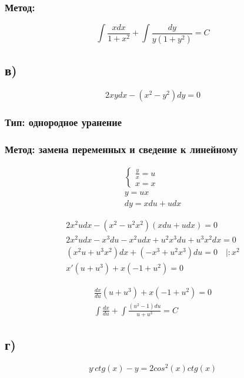 \documentclass[a4paper]{article}
\begin{document}
\subsubsection*{Метод:}
\begin{equation*}
\int \frac{xdx}{1+x^2}+\int \frac{dy}{y(1+y^2)} = C
\end{equation*}

\subsection*{в)}
\begin{equation*}
2xy dx - (x^2 - y^2)dy = 0
\end{equation*}
\subsubsection*{Тип: однородное уранение}

\subsubsection*{Метод: замена переменных и сведение к линейному}

\begin{gather*}
\begin{cases}
\frac{y}{x}=u \\
x=x
\end{cases}\\
y=ux \\
dy=xdu+udx
\end{gather*}

\begin{gather*}
2x^2udx-(x^2-u^2x^2)(xdu+udx)=0 \\
2x^2udx-x^3du-x^2udx+u^2x^3du+u^3x^2dx=0 \\
(x^2u+u^3x^2)dx+(-x^3+u^2x^3)du=0 \quad |:x^2 \\
x'(u+u^3)+x(-1+u^2)=0
\end{gather*}

\begin{gather*}
\frac{dx}{du}(u+u^3)+x(-1+u^2)=0\\
\int\frac{dx}{du}+\int\frac{(u^2-1)du}{u+u^3} = C
\end{gather*}

\subsection*{г)}
\begin{equation*}
y^, ctg(x) - y = 2 cos^2(x) ctg(x)
\end{equation*}
\end{document}
